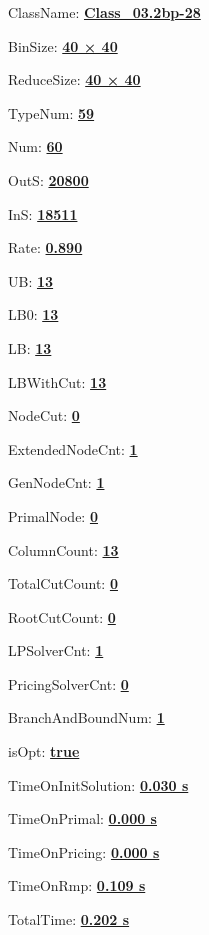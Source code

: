 \documentclass[11pt]{article}
\begin{document}
\pagestyle{empty}


ClassName: \underline{\textbf{Class_03.2bp-28}}
\par
BinSize: \underline{\textbf{40 × 40}}
\par
ReduceSize: \underline{\textbf{40 × 40}}
\par
TypeNum: \underline{\textbf{59}}
\par
Num: \underline{\textbf{60}}
\par
OutS: \underline{\textbf{20800}}
\par
InS: \underline{\textbf{18511}}
\par
Rate: \underline{\textbf{0.890}}
\par
UB: \underline{\textbf{13}}
\par
LB0: \underline{\textbf{13}}
\par
LB: \underline{\textbf{13}}
\par
LBWithCut: \underline{\textbf{13}}
\par
NodeCut: \underline{\textbf{0}}
\par
ExtendedNodeCnt: \underline{\textbf{1}}
\par
GenNodeCnt: \underline{\textbf{1}}
\par
PrimalNode: \underline{\textbf{0}}
\par
ColumnCount: \underline{\textbf{13}}
\par
TotalCutCount: \underline{\textbf{0}}
\par
RootCutCount: \underline{\textbf{0}}
\par
LPSolverCnt: \underline{\textbf{1}}
\par
PricingSolverCnt: \underline{\textbf{0}}
\par
BranchAndBoundNum: \underline{\textbf{1}}
\par
isOpt: \underline{\textbf{true}}
\par
TimeOnInitSolution: \underline{\textbf{0.030 s}}
\par
TimeOnPrimal: \underline{\textbf{0.000 s}}
\par
TimeOnPricing: \underline{\textbf{0.000 s}}
\par
TimeOnRmp: \underline{\textbf{0.109 s}}
\par
TotalTime: \underline{\textbf{0.202 s}}
\par
\newpage


\end{document}

